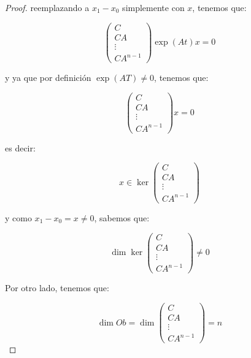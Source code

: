 \begin{proof}
			reemplazando a $x_1 - x_0$ simplemente con $x$, tenemos que:

			\begin{equation*}
				\begin{pmatrix}
					C \\
					CA \\
					\vdots \\
					CA^{n-1}
				\end{pmatrix} \exp{(A t)} x = 0
			\end{equation*}

			y ya que por definición $\exp{(A T)} \ne 0$, tenemos que:

			\begin{equation*}
				\begin{pmatrix}
					C \\
					CA \\
					\vdots \\
					CA^{n-1}
				\end{pmatrix} x = 0
			\end{equation*}

			es decir:

			\begin{equation*}
				x \in \ker
				\begin{pmatrix}
					C \\
					CA \\
					\vdots \\
					CA^{n-1}
				\end{pmatrix}
			\end{equation*}

			y como $x_1 - x_0 = x \ne 0$, sabemos que:

			\begin{equation*}
				\dim{\ker}
				\begin{pmatrix}
					C \\
					CA \\
					\vdots \\
					CA^{n-1}
				\end{pmatrix} \ne 0
			\end{equation*}

			Por otro lado, tenemos que:

			\begin{equation*}
				\dim{Ob} = \dim
				\begin{pmatrix}
					C \\
					CA \\
					\vdots \\
					CA^{n-1}
				\end{pmatrix} = n
			\end{equation*}


\end{proof}
